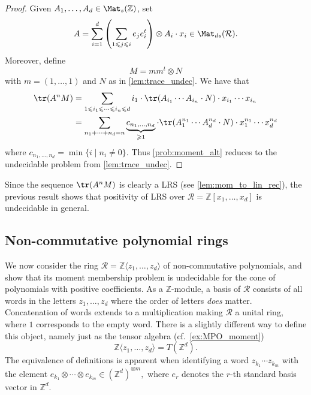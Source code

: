 \begin{proof}
Given $A_1,\ldots, A_d\in \Mat_{s}(\mathbb Z)$, set
$$A =\sum_{i=1}^d \left(\sum_{1 \leqslant j \leqslant i} e_j e_i^t  \right) \otimes A_i \cdot x_i \in \Mat_{ds}(\mathcal R).$$
Moreover, define
$$ M = m m^t \otimes N $$
with $m = (1, \ldots, 1)$ and $N$ as in \cref{lem:trace_undec}. We have that
\begin{align*}
\tr(A^n M) &= \sum_{1 \leqslant i_1 \leqslant \cdots \leqslant i_n \leqslant d} i_1\cdot  \tr(A_{i_1} \cdots A_{i_n} \cdot N) \cdot x_{i_1} \cdots x_{i_n}
\\ &= \sum_{n_1 + \cdots + n_d = n}\underbrace{c_{n_1,\ldots, n_d}}_{\geqslant 1} \cdot \tr(A_1^{n_1} \cdots A_{d}^{n_d} \cdot N)\cdot x_1^{n_1} \cdots x_d^{n_d}
\end{align*} where $c_{n_1,\ldots, n_d}=\min\{i\mid n_i\neq 0\}.$
Thus \cref{prob:moment_alt} reduces to the undecidable problem from \cref{lem:trace_undec}.
\end{proof}

\begin{remark} Since the sequence $\tr(A^nM)$ is clearly a LRS (see \cref{lem:mom_to_lin_rec}), the previous result shows that positivity of LRS over $\mathcal R=\mathbb Z[x_1,\ldots,x_d]$ is undecidable in general. \demo
\end{remark}

\subsection{Non-commutative polynomial rings}
\label{ssec:non-commAlgebra}

We now consider  the ring $\mathcal R=\mathbb Z\langle z_1,\ldots, z_d\rangle$ of non-commutative polynomials, and show that its moment membership problem is undecidable for the cone of polynomials with positive coefficients.
As a $\mathbb Z$-module,  a basis of $\mathcal R$ consists of all words in the letters $z_1,\ldots, z_d$ where the order of letters {\it does} matter. Concatenation of words extends to a multiplication making $\mathcal R$ a unital ring, where $1$ corresponds to the empty word. 
There is a slightly different way to define this object, namely just as the tensor algebra (cf.\ \cref{ex:MPO_moment})
$$\mathbb Z\langle z_1,\ldots, z_d\rangle= T(\mathbb Z^d).$$ 
The equivalence of definitions is apparent when identifying a word $z_{k_1}\cdots z_{k_m}$ with the element $e_{k_1}\otimes \cdots \otimes e_{k_m}\in \left(\mathbb Z^d\right)^{\otimes m},$ where $e_r$ denotes the $r$-th standard basis vector in $\mathbb Z^d$.


